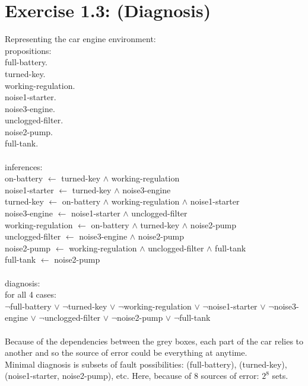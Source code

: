 \documentclass[10pt,a4paper]{article}
\begin{document}
\section*{Exercise 1.3: (Diagnosis)} 
Representing the car engine environment: \\
propositions: \\
full-battery.\\
turned-key.\\
working-regulation.\\
noise1-starter. \\
noise3-engine. \\
unclogged-filter. \\
noise2-pump. \\
full-tank. \\
\\
inferences:\\
on-battery $\leftarrow$ turned-key $\land$ working-regulation \\
noise1-starter $\leftarrow$ turned-key $\land$ noise3-engine \\
turned-key $\leftarrow$ on-battery $\land$ working-regulation $\land$ noise1-starter\\
noise3-engine  $\leftarrow$ noise1-starter $\land$ unclogged-filter \\
working-regulation $\leftarrow$ on-battery $\land$ turned-key $\land$ noise2-pump \\
unclogged-filter $\leftarrow$ noise3-engine $\land$ noise2-pump \\
noise2-pump $\leftarrow$ working-regulation $\land$ unclogged-filter $\land$ full-tank \\
full-tank $\leftarrow$ noise2-pump \\
\\
diagnosis: \\
for all 4 cases: \\
$\lnot$full-battery $\lor$
$\lnot$turned-key $\lor$
$\lnot$working-regulation $\lor$
$\lnot$noise1-starter $\lor$
$\lnot$noise3-engine $\lor$
$\lnot$unclogged-filter $\lor$
$\lnot$noise2-pump $\lor$
$\lnot$full-tank \\
\\
Because of the dependencies between the grey boxes, each part of the car relies to another and so the source of error could be everything at anytime. \\
Minimal diagnosis is subsets of fault possibilities:
(full-battery), (turned-key), (noise1-starter, noise2-pump), etc. Here, because of 8 sources of error: $2^{8}$ sets.
\end{document}
